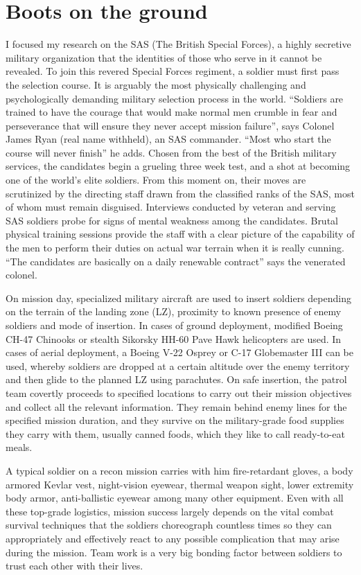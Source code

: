 \documentclass{article}
\begin{document}
\section{Boots on the ground}
I focused my research on the SAS (The British Special Forces), a highly secretive military organization that the identities of those who serve in it cannot be revealed.
 To join this revered Special Forces regiment, a soldier must first pass the selection course. It is arguably the most physically challenging and psychologically demanding
 military selection process in the world. “Soldiers are trained to have the courage that would make normal men crumble in fear and perseverance that will ensure they never 
accept mission failure”, says Colonel James Ryan (real name withheld), an SAS commander. “Most who start the course will never finish” he adds. Chosen from the best
 of the British military services, the candidates begin a grueling three week test, and a shot at becoming one of the world’s elite soldiers. From this moment on, their moves are scrutinized
 by the directing staff drawn from the classified ranks of the SAS, most of whom must remain disguised.  Interviews conducted by veteran and serving SAS soldiers probe for signs of
 mental weakness among the candidates. Brutal physical training sessions provide the staff with a clear picture of the capability of the men to perform their duties on actual war terrain 
when it is really cunning. “The candidates are basically on a daily renewable contract” says the venerated colonel. 

On mission day, specialized military aircraft are used to insert soldiers depending on the terrain of the landing zone (LZ), proximity to known presence of enemy soldiers and
 mode of insertion. In cases of ground deployment, modified Boeing CH-47 Chinooks or stealth Sikorsky HH-60 Pave Hawk helicopters are used. In cases of aerial deployment, 
a Boeing V-22 Osprey or C-17 Globemaster III can be used, whereby soldiers are dropped at a certain altitude over the enemy territory and then glide to the planned LZ using parachutes.
 On safe insertion, the patrol team covertly proceeds to specified locations to carry out their mission objectives and collect all the relevant information. They remain behind enemy lines for 
the specified mission duration, and they survive on the military-grade food supplies they carry with them, usually canned foods, which they like to call ready-to-eat meals.

 A typical soldier on a  recon mission carries with him fire-retardant gloves, a body armored Kevlar vest, night-vision eyewear, thermal weapon sight, lower extremity body armor, anti-ballistic eyewear among many other equipment.
 Even with all these top-grade logistics, mission success largely depends on the vital combat survival techniques that the soldiers choreograph countless times so they can appropriately and effectively react to any possible
 complication that may arise during the mission. Team work is a very big bonding factor between soldiers to trust each other with their lives.
\end{document}
